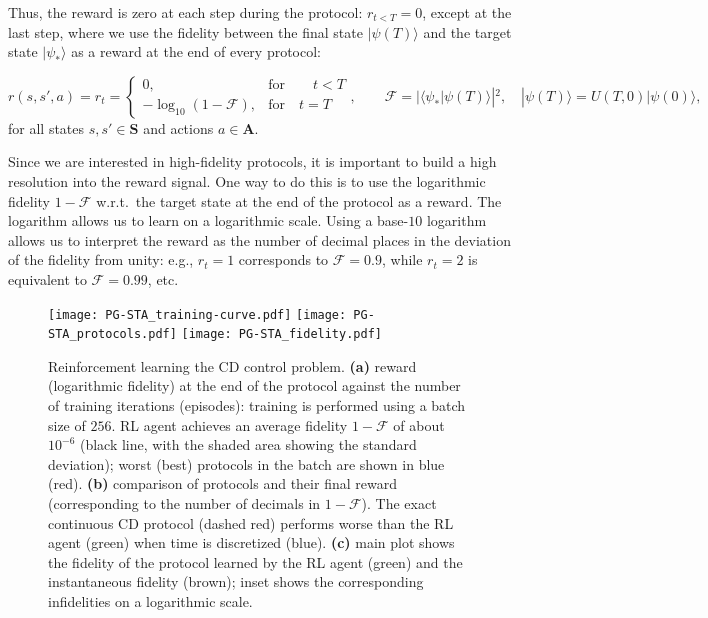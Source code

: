 \begin{itemize}
    Thus, the reward is zero at each step during the protocol: $r_{t<T}=0$, except at the last step, where we use the fidelity between the final state $|\psi(T)\rangle$ and the target state $|\psi_\ast\rangle$ as a reward at the end of every protocol: 

    \begin{equation}
    r(s,s',a)= r_t=
    \left\{\begin{array}{lr}
        0, & \text{for}\qquad t<T\\
        -\log_{10}\left(1-\mathcal F\right), & \text{for}\quad t=T
        \end{array}\right.
    ,\qquad \mathcal F=|\langle\psi_\ast|\psi(T)\rangle|^2,\quad |\psi(T)\rangle = U(T,0)|\psi(0)\rangle,
    \end{equation}
    for all states $s,s'\in\mathbf{S}$ and actions $a\in\mathbf{A}$. 

    Since we are interested in high-fidelity protocols, it is important to build a high resolution into the reward signal. One way to do this is to use the logarithmic fidelity $1-\mathcal{F}$ w.r.t.~the target state at the end of the protocol as a reward. The logarithm allows us to learn on a logarithmic scale. Using a base-$10$ logarithm allows us to interpret the reward as the number of decimal places in the deviation of the fidelity from unity: e.g., $r_t=1$ corresponds to $\mathcal F=0.9$, while $r_t=2$ is equivalent to $\mathcal F=0.99$, etc.

\end{itemize}


\begin{figure}[t]
\texttt{[image: PG-STA\_training-curve.pdf]}
\texttt{[image: PG-STA\_protocols.pdf]}
\texttt{[image: PG-STA\_fidelity.pdf]}
\caption{
Reinforcement learning the CD control problem. 
\textbf{(a)} reward (logarithmic fidelity) at the end of the protocol against the number of training iterations (episodes): training is performed using a batch size of $256$. RL agent achieves an average fidelity $1-\mathcal{F}$ of about $10^{-6}$ (black line, with the shaded area showing the standard deviation); worst (best) protocols in the batch are shown in blue (red). 
\textbf{(b)} comparison of protocols and their final reward (corresponding to the number of decimals in $1-\mathcal{F}$). The exact continuous CD protocol (dashed red) performs worse than the RL agent (green) when time is discretized (blue).
\textbf{(c)} main plot shows the fidelity of the protocol learned by the RL agent (green) and the instantaneous fidelity (brown); inset shows the corresponding infidelities on a logarithmic scale.
}
\label{fig:RL-CD}
\end{figure}

